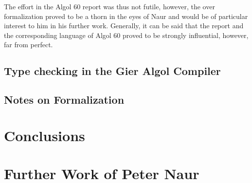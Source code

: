 \documentclass{article}
\begin{document}
The effort in the Algol 60 report was thus not futile, however, the over formalization proved to be a thorn in the eyes of Naur and would be of particular interest to him in his further work. Generally, it can be said that the report and the corresponding language of Algol 60 proved to be strongly influential, however, far from perfect.

\subsection{Type checking in the Gier Algol Compiler}

\subsection{Notes on Formalization}

\section{Conclusions}

\section{Further Work of Peter Naur}



\end{document}
